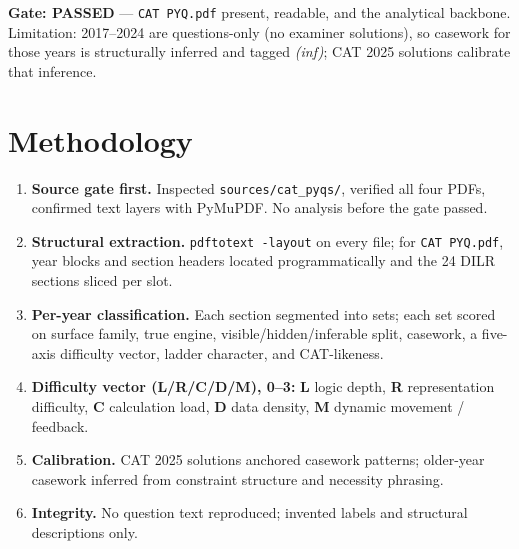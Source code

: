 \documentclass[11pt,a4paper]{article}
\begin{document}
\textbf{Gate: PASSED} --- \texttt{CAT PYQ.pdf} present, readable, and the analytical backbone. Limitation: 2017--2024 are questions-only (no examiner solutions), so casework for those years is structurally inferred and tagged \emph{(inf)}; CAT 2025 solutions calibrate that inference.

\section{Methodology}
\begin{enumerate}[leftmargin=1.6em]
\item \textbf{Source gate first.} Inspected \texttt{sources/cat\_pyqs/}, verified all four PDFs, confirmed text layers with PyMuPDF. No analysis before the gate passed.
\item \textbf{Structural extraction.} \texttt{pdftotext -layout} on every file; for \texttt{CAT PYQ.pdf}, year blocks and section headers located programmatically and the 24 DILR sections sliced per slot.
\item \textbf{Per-year classification.} Each section segmented into sets; each set scored on surface family, true engine, visible/hidden/inferable split, casework, a five-axis difficulty vector, ladder character, and CAT-likeness.
\item \textbf{Difficulty vector (L/R/C/D/M), 0--3:} \textbf{L} logic depth, \textbf{R} representation difficulty, \textbf{C} calculation load, \textbf{D} data density, \textbf{M} dynamic movement / feedback.
\item \textbf{Calibration.} CAT 2025 solutions anchored casework patterns; older-year casework inferred from constraint structure and necessity phrasing.
\item \textbf{Integrity.} No question text reproduced; invented labels and structural descriptions only.
\end{enumerate}

\end{document}
